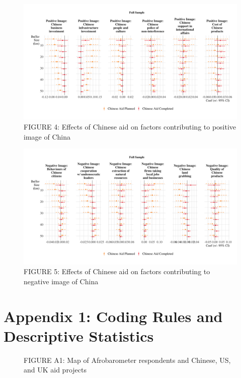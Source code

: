 \documentclass[9pt]{article}
\begin{document}
\begin{figure}[H]
\centering
\includegraphics[width=1\textwidth]{figures/figure_04.png}
\caption{FIGURE 4: Effects of Chinese aid on factors contributing to positive image of China}
\end{figure}

\begin{figure}[H]
\centering
\includegraphics[width=1\textwidth]{figures/figure_05.png}
\caption{FIGURE 5: Effects of Chinese aid on factors contributing to negative image of China}
\end{figure}


\appendix
\section{Appendix 1: Coding Rules and Descriptive Statistics}

\begin{figure}[H]
\centering
\caption{FIGURE A1: Map of Afrobarometer respondents and Chinese, US, and UK aid projects}
\end{figure}
\end{document}
